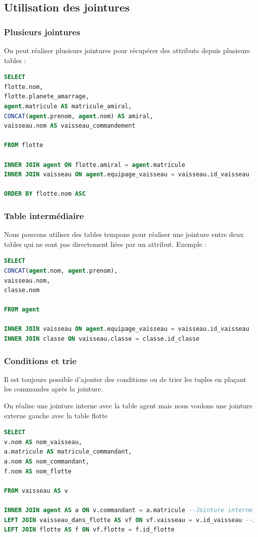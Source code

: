 \subsection{Utilisation des jointures}

\subsubsection{Plusieurs jointures}

On peut réaliser plusieurs jointures pour récupérer des attributs depuis plusieurs tables :
\begin{lstlisting}[language=SQL]
SELECT
flotte.nom,
flotte.planete_amarrage,
agent.matricule AS matricule_amiral,
CONCAT(agent.prenom, agent.nom) AS amiral,
vaisseau.nom AS vaisseau_commandement

FROM flotte

INNER JOIN agent ON flotte.amiral = agent.matricule
INNER JOIN vaisseau ON agent.equipage_vaisseau = vaisseau.id_vaisseau

ORDER BY flotte.nom ASC
\end{lstlisting}

\subsubsection{Table intermédiaire}

Nous pouvons utiliser des tables tempons pour réaliser une jointure entre deux tables qui ne sont pas directement liées par un attribut. Exemple :

\begin{lstlisting}[language=SQL]
SELECT
CONCAT(agent.nom, agent.prenom),
vaisseau.nom,
classe.nom

FROM agent

INNER JOIN vaisseau ON agent.equipage_vaisseau = vaisseau.id_vaisseau
INNER JOIN classe ON vaisseau.classe = classe.id_classe
\end{lstlisting}

\subsubsection{Conditions et trie}
Il est toujours possible d'ajouter des conditions ou de trier les tuples en plaçant les commandes après la jointure.

On réalise une jointure interne avec la table agent mais nous voulons une jointure externe gauche avec la table flotte
\begin{lstlisting}[language=SQL]
SELECT
v.nom AS nom_vaisseau,
a.matricule AS matricule_commandant,
a.nom AS nom_commandant,
f.nom AS nom_flotte

FROM vaisseau AS v

INNER JOIN agent AS a ON v.commandant = a.matricule --Jointure interne
LEFT JOIN vaisseau_dans_flotte AS vf ON vf.vaisseau = v.id_vaisseau --Jointure externe, table intermediaire
LEFT JOIN flotte AS f ON vf.flotte = f.id_flotte
\end{lstlisting}

